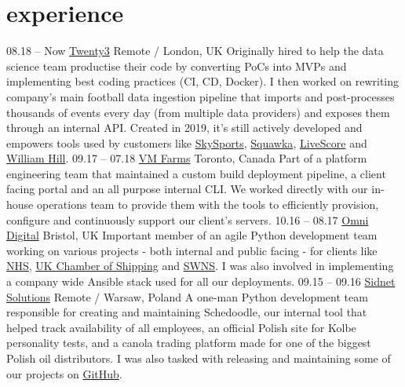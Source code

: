 \documentclass[]{cv-style}  %
\begin{document}

\section{experience}
  \vspace{-0.25cm}

\begin{entrylist}
\entry
  {08.18 -- Now}
  {\href{https://twenty3.sport/}{Twenty3}}
  {Remote / London, UK}
  {Originally hired to help the data science team productise their code by converting PoCs into MVPs and implementing best coding practices (CI, CD, Docker). I then worked on rewriting company's main football data ingestion pipeline that imports and post-processes thousands of events every day (from multiple data providers) and exposes them through an internal API. Created in 2019, it's still actively developed and empowers tools used by customers like \href{https://www.skysports.com/}{SkySports}, \href{https://www.squawka.com/}{Squawka}, \href{https://www.livescore.com/}{LiveScore} and \href{https://www.williamhill.com/}{William Hill}.}
\entry
  {09.17 -- 07.18}
  {\href{https://vmfarms.com/}{VM Farms}}
  {Toronto, Canada}
  {Part of a platform engineering team that maintained a custom build deployment pipeline, a client facing portal and an all purpose internal CLI. We worked directly with our in-house operations team to provide them with the tools to efficiently provision, configure and continuously support our client's servers.}
\entry
  {10.16 -- 08.17}
  {\href{https://omni-digital.co.uk/}{Omni Digital}}
  {Bristol, UK}
  {Important member of an agile Python development team working on various projects - both internal and public facing - for clients like \href{https://www.bristolccg.nhs.uk/}{NHS}, \href{https://www.ukchamberofshipping.com/}{UK Chamber of Shipping} and \href{http://swns.com/}{SWNS}. I was also involved in implementing a company wide Ansible stack used for all our deployments.}
\entry
  {09.15 -- 09.16}
  {\href{https://sidnet.info/}{Sidnet Solutions}}
  {Remote / Warsaw, Poland}
  {A one-man Python development team responsible for creating and maintaining Schedoodle, our internal tool that helped track availability of all employees, an official Polish site for Kolbe personality tests, and a canola trading platform made for one of the biggest Polish oil distributors. I was also tasked with releasing and maintaining some of our projects on \href{https://github.com/Pythonity}{GitHub}.}

\end{entrylist}
\end{document}
